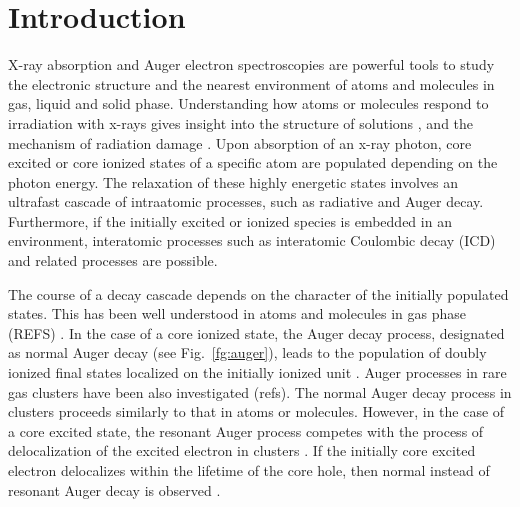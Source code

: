 \section{Introduction}

X-ray absorption and Auger electron spectroscopies are powerful tools to study the electronic structure and the nearest environment of atoms and molecules in gas, liquid and solid phase. Understanding how atoms or molecules respond to irradiation with x-rays gives insight into the structure of solutions \citep{Pokapanich09:7264}, and the mechanism of radiation damage \citep{ONeill02:329,Carugo05:213,Stumpf16:237}. Upon absorption of an x-ray photon, core excited or core ionized states of a specific atom are populated depending on the photon energy. The relaxation of these highly energetic states involves an ultrafast cascade of intraatomic processes, such as radiative and Auger decay. Furthermore, if the initially excited or ionized species is embedded in an environment, interatomic processes such as interatomic Coulombic decay (ICD) and related processes \citep{Pokapanich09:7264,Pokapanich11:13430,Stumpf16:237,unger17:708} are possible.


The course of a decay cascade depends on the character of the initially populated states. This has been well understood in atoms and molecules in gas phase (REFS) \citep{stoychev08:074307,Demekhin08:043421,Demekhin09:104303,Ouchi11:053415,Miteva14:164303,Miteva14:064307}. In the case of a core ionized state, the Auger decay process, designated as normal Auger decay (see Fig.\ \ref{fg:auger}), leads to the population of doubly ionized final states localized on the initially ionized unit \citep{stoychev08:074307,Demekhin08:043421,Demekhin09:104303,Ouchi11:053415}. Auger processes in rare gas clusters have been also investigated (refs). The normal Auger decay process in clusters proceeds similarly to that in atoms or molecules. However, in the case of a core excited state, the resonant Auger process competes with the process of delocalization of the excited electron in clusters \citep{Bjorneholm95:3017}. If the initially core excited electron delocalizes within the lifetime of the core hole, then normal instead of resonant Auger decay is observed \citep{Bjorneholm95:3017}. 


